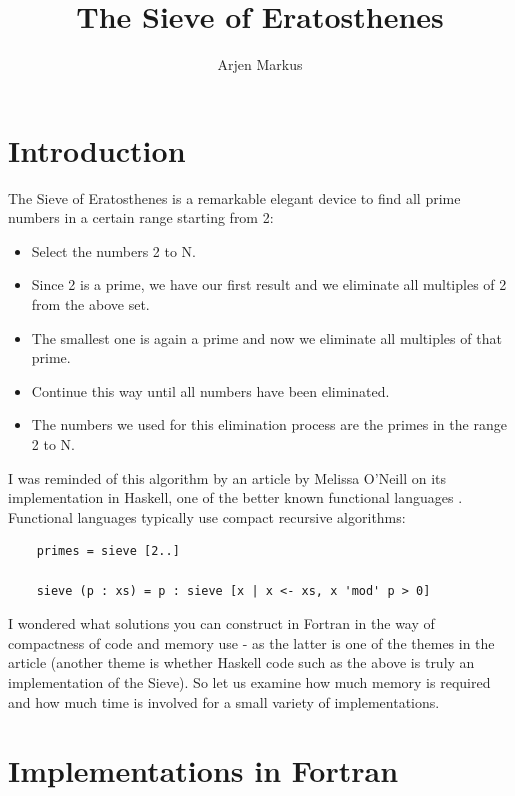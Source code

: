 \documentclass[onecolumn]{article}
\begin{document}
\title{The Sieve of Eratosthenes}

\author{Arjen Markus}

\maketitle

\section*{Introduction}
The Sieve of Eratosthenes is a remarkable elegant device to find all prime numbers in a certain range starting from 2:

\begin{itemize}
\item   Select the numbers 2 to N.
\item   Since 2 is a prime, we have our first result and we eliminate all multiples of 2 from the above set.
\item   The smallest one is again a prime and now we eliminate all multiples of that prime.
\item   Continue this way until all numbers have been eliminated.
\item   The numbers we used for this elimination process are the primes in the range 2 to N.
\end{itemize}

I was reminded of this algorithm by an article by Melissa O'Neill on its implementation in Haskell, one of the better known functional languages \cite{SieveEratosthenes}. Functional languages typically use compact recursive algorithms:

\begin{verbatim}
    primes = sieve [2..]

    sieve (p : xs) = p : sieve [x | x <- xs, x 'mod' p > 0]
\end{verbatim}

I wondered what solutions you can construct in Fortran in the way of compactness of code and memory use - as the latter is one of the themes in the article (another theme is whether Haskell code such as the above is truly an implementation of the Sieve). So let us examine how much memory is required and how much time is involved for a small variety of implementations.

\section*{Implementations in Fortran}
\end{document}

